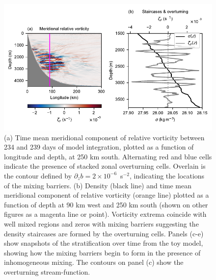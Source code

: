 \begin{figure}
    \centering
    \includegraphics{../figures/Figure3.pdf}
    \caption{(a) Time mean meridional component of relative vorticity between 234 and 239 days of model integration, plotted as a function of longitude and depth, at 250 km south. Alternating red and blue cells indicate the presence of stacked zonal overturning cells. Overlain is the contour defined by $\partial_z b = 2 \times 10^{-6}$~s$^{-2}$, indicating the locations of the mixing barriers. (b) Density (black line) and time mean meridional component of relative vorticity (orange line) plotted as a function of depth at 90 km west and 250 km south (shown on other figures as a magenta line or point). Vorticity extrema coincide with well mixed regions and zeros with mixing barriers suggesting the density staircases are formed by the overturning cells. Panels (c-e) show snapshots of the stratification over time from the toy model, showing how the mixing barriers begin to form in the presence of inhomogeneous mixing. The contours on panel (c) show the overturning stream-function.}
    \label{fig:StaircaseMechanism}
\end{figure}

